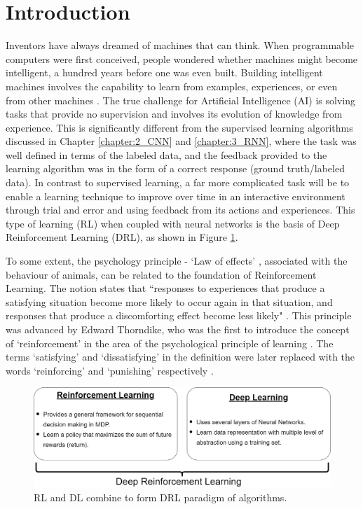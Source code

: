 \section{Introduction}

Inventors have always dreamed of machines that can think. When programmable computers were first conceived, people wondered whether machines might become intelligent, a hundred years before one was even built. Building intelligent machines involves the capability to learn from examples, experiences, or even from other machines \parencite{turing1950mind}. The true challenge for Artificial Intelligence (AI) is solving tasks that provide no supervision and involves its evolution of knowledge from experience. This is significantly different from the supervised learning algorithms discussed in Chapter \ref{chapter:2_CNN} and \ref{chapter:3_RNN}, where the task was well defined in terms of the labeled data, and the feedback provided to the learning algorithm was in the form of a correct response (ground truth/labeled data). In contrast to supervised learning, a far more complicated task will be to enable a learning technique to improve over time in an interactive environment through trial and error and using feedback from its actions and experiences. This type of learning (RL) when coupled with neural networks is the basis of Deep Reinforcement Learning (DRL), as shown in Figure \ref{fig:RL_DL_RL}.

To some extent, the psychology principle - `Law of effects' \parencite{thorndike1913psychology}, associated with the behaviour of animals, can be related to the foundation of Reinforcement Learning. The notion states that ``responses to experiences that produce a satisfying situation become more likely to occur again in that situation, and responses that produce a discomforting effect become less likely" \parencite{gray2011psychology}. This principle was advanced by Edward Thorndike, who was the first to introduce the concept of `reinforcement' in the area of the psychological principle of learning \parencite{thorndike1898animal}. The terms `satisfying' and `dissatisfying' in the definition were later replaced with the words `reinforcing' and `punishing' respectively \parencite{mazur2015learning}.

\begin{figure}[h!]
    \centering
    \includegraphics[width=\textwidth]{Figures/Ch_RL/RL_intro_DL_RL2.png}
    \caption{RL and DL combine to form DRL paradigm of algorithms.}
    \label{fig:RL_DL_RL}
\end{figure}

